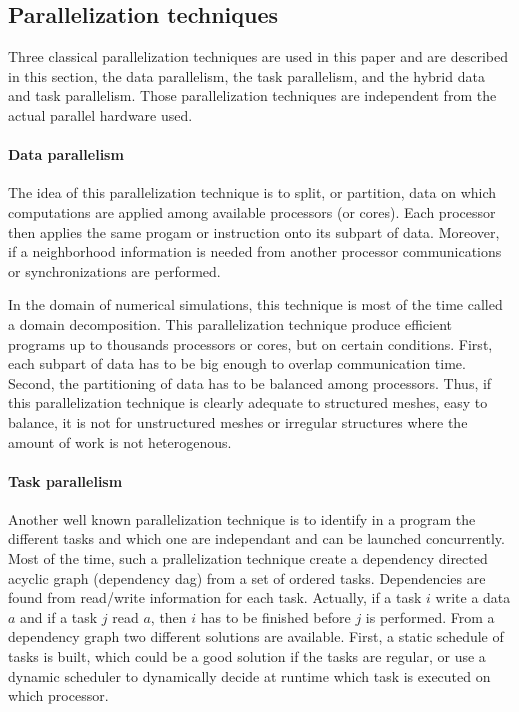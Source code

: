 \subsection{Parallelization techniques}
\label{sect:parallel}
Three classical parallelization techniques are used in this paper and are described in this section, the data parallelism, the task parallelism, and the hybrid data and task parallelism. Those parallelization techniques are independent from the actual parallel hardware used.

\paragraph{Data parallelism} The idea of this parallelization technique is to split, or partition, data on which computations are applied among available processors (or cores). Each processor then applies the same progam or instruction onto its subpart of data. Moreover, if a neighborhood information is needed from another processor communications or synchronizations are performed. 

In the domain of numerical simulations, this technique is most of the time called a domain decomposition. This parallelization technique produce efficient programs up to thousands processors or cores, but on certain conditions. First, each subpart of data has to be big enough to overlap communication time. Second, the partitioning of data has to be balanced among processors. Thus, if this parallelization technique is clearly adequate to structured meshes, easy to balance, it is not for unstructured meshes or irregular structures where the amount of work is not heterogenous.

\paragraph{Task parallelism} Another well known parallelization technique is to identify in a program the different tasks and which one are independant and can be launched concurrently. Most of the time, such a prallelization technique create a dependency directed acyclic graph (dependency dag) from a set of ordered tasks. Dependencies are found from read/write information for each task. Actually, if a task $i$ write a data $a$ and if a task $j$ read $a$, then $i$ has to be finished before $j$ is performed. From a dependency graph two different solutions are available. First, a static schedule of tasks is built, which could be a good solution if the tasks are regular, or use a dynamic scheduler to dynamically decide at runtime which task is executed on which processor.

